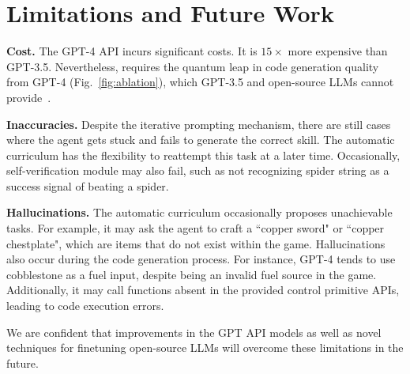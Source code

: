 \section{Limitations and Future Work}
\label{sec:limitation}

\textbf{Cost.} The GPT-4 API incurs significant costs. It is $15 \times$ more expensive than GPT-3.5. Nevertheless, \voyager requires the quantum leap in code generation quality from GPT-4 (Fig.~\ref{fig:ablation}), which GPT-3.5 and open-source LLMs cannot provide~\cite{touvron2023llama}. 

\textbf{Inaccuracies.} Despite the iterative prompting mechanism, there are still cases where the agent gets stuck and fails to generate the correct skill. The automatic curriculum has the flexibility to reattempt this task at a later time.
Occasionally, self-verification module may also fail, such as not recognizing spider string as a success signal of beating a spider.

\textbf{Hallucinations.}
The automatic curriculum occasionally proposes unachievable tasks. For example, it may ask the agent to craft a ``copper sword" or ``copper chestplate", which are items that do not exist within the game. Hallucinations also occur during the code generation process. For instance, GPT-4 tends to use cobblestone as a fuel input, despite being an invalid fuel source in the game. Additionally, it may call functions absent in the provided control primitive APIs, leading to code execution errors.

We are confident that improvements in the GPT API models as well as novel techniques for finetuning open-source LLMs will overcome these limitations in the future.